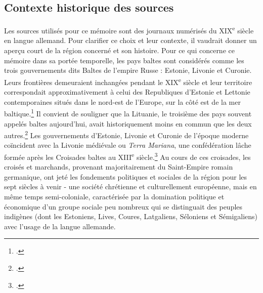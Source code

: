 \documentclass[a4paper,twoside,12pt]{article}
\begin{document}
\subsection*{Contexte historique des sources} \label{context_historique}


Les sources utilisés pour ce mémoire sont des journaux numérisés du XIX\textsuperscript{e} siècle en langue allemand. Pour clarifier ce choix et leur contexte, il vaudrait donner un aperçu court de la région concerné et son histoire. Pour ce qui concerne ce mémoire dans sa portée temporelle, les pays baltes sont considérés comme les trois gouvernements dits Baltes de l'empire Russe : Estonie, Livonie et Curonie. Leurs frontières demeuraient inchangées pendant le XIX\textsuperscript{e} siècle et leur territoire correspondait approximativement à celui des Republiques d'Estonie et Lettonie contemporaines situés dans le nord-est de l'Europe, sur la côté est de la mer baltique.\footcites[Pour un aperçu général de l'histoire de cette région, cf.][]{champonnois_estoniens_2004}{kasekamp_history_2018} Il convient de souligner que la Lituanie, le troisième des pays souvent appelés \og baltes \fg{} aujourd'hui, avait historiquement moins en commun que les deux autres.\footcite[51-57]{balcytiene_culture_2012} Les gouvernements d'Estonie, Livonie et Curonie de l'époque moderne coïncident avec la Livonie médiévale ou \textit{Terra Mariana}, une confédération lâche formée après les Croisades baltes au XIII\textsuperscript{e} siècle.\footcites[Une présentation critique de ces événements se trouve dans][]{murray_clash_2009}{selart_livland_2017} Au cours de ces croisades, les croisés et marchands, provenant majoritairement du Saint-Empire romain germanique, ont jeté les fondements politiques et sociales de la région pour les sept siècles à venir - une société chrétienne et culturellement européenne, mais en même temps semi-coloniale, caractérisée par la domination politique et économique d'un groupe sociale peu nombreux qui se distinguait des peuples indigènes (dont les Estoniens, Lives, Coures, Latgaliens, Séloniens et Sémigaliens) avec l'usage de la langue allemande.
\end{document}
